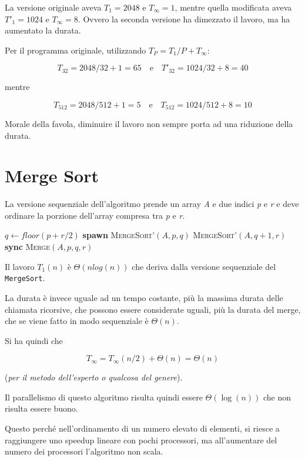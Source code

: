La versione originale aveva $T_1 = 2048$ e $T_\infty = 1$, mentre quella modificata aveva $T'_1 = 1024$ e $T_\infty = 8$. Ovvero la seconda versione ha dimezzato il lavoro, ma ha aumentato la durata.

Per il programma originale, utilizzando $T_P = T_1/P + T_\infty$:

$$T_{32} = 2048/32 +1 = 65 \quad \text{e} \quad T'_{32} = 1024/32 +8 = 40$$

mentre

$$T_{512} = 2048/512 + 1 = 5 \quad \text{e} \quad  T_{512} = 1024/512 + 8 = 10$$

Morale della favola, diminuire il lavoro non sempre porta ad una riduzione della durata.

\section{Merge Sort}\label{merge-sort}

La versione sequenziale dell'algoritmo prende un array \emph{A} e due indici \emph{p} e \emph{r} e deve ordinare la porzione dell'array compresa tra \emph{p} e \emph{r}.

\begin{breakablealgorithm}
	\begin{algorithmic}[1]
    \State $q \gets floor(p+r/2)$
    \State \textbf{spawn } \textsc{MergeSort'}$(A,p,q)$
    \State \textsc{MergeSort'}$(A,q+1,r)$
    \State \textbf{sync}
    \State \textsc{Merge}$(A,p,q,r)$
\EndIf
\EndFunction
	\end{algorithmic}
\end{breakablealgorithm}

Il lavoro $T_1(n)$ è $\Theta(n log(n))$ che deriva dalla versione sequenziale del \texttt{MergeSort}.

La durata è invece uguale ad un tempo costante, più la massima durata delle chiamata ricorsive, che possono essere considerate uguali, più la durata del merge, che se viene fatto in modo sequenziale è $\Theta(n)$. 

Si ha quindi che 

$$T_\infty = T_\infty(n/2) + \Theta(n) = \Theta(n)$$ 

(\emph{per il metodo dell'esperto o qualcosa del genere}).

Il parallelismo di questo algoritmo risulta quindi essere $\Theta(\log(n))$ che non risulta essere buono.

Questo perché nell'ordinamento di un numero elevato di elementi, si riesce a raggiungere uno speedup lineare con pochi processori, ma all'aumentare del numero dei processori l'algoritmo non scala.

